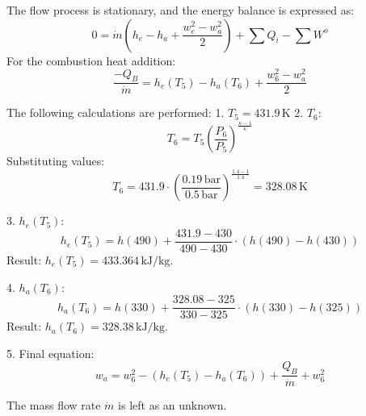 The flow process is stationary, and the energy balance is expressed as:  
\[
0 = \dot{m} \left( h_e - h_a + \frac{w_e^2 - w_a^2}{2} \right) + \sum Q_i - \sum W^o
\]  
For the combustion heat addition:  
\[
\frac{-Q_B}{\dot{m}} = h_e(T_5) - h_a(T_6) + \frac{w_6^2 - w_a^2}{2}
\]  

The following calculations are performed:  
1. \( T_5 = 431.9 \, \text{K} \)  
2. \( T_6 \):  
\[
T_6 = T_5 \left( \frac{P_6}{P_5} \right)^{\frac{\kappa - 1}{\kappa}}  
\]  
Substituting values:  
\[
T_6 = 431.9 \cdot \left( \frac{0.19 \, \text{bar}}{0.5 \, \text{bar}} \right)^{\frac{1.4 - 1}{1.4}} = 328.08 \, \text{K}
\]  

3. \( h_e(T_5) \):  
\[
h_e(T_5) = h(490) + \frac{431.9 - 430}{490 - 430} \cdot \left( h(490) - h(430) \right)  
\]  
Result: \( h_e(T_5) = 433.364 \, \text{kJ/kg} \).  

4. \( h_a(T_6) \):  
\[
h_a(T_6) = h(330) + \frac{328.08 - 325}{330 - 325} \cdot \left( h(330) - h(325) \right)  
\]  
Result: \( h_a(T_6) = 328.38 \, \text{kJ/kg} \).  

5. Final equation:  
\[
w_a = w_6^2 - \left( h_e(T_5) - h_a(T_6) \right) + \frac{Q_B}{\dot{m}} + w_6^2
\]  

The mass flow rate \( \dot{m} \) is left as an unknown.